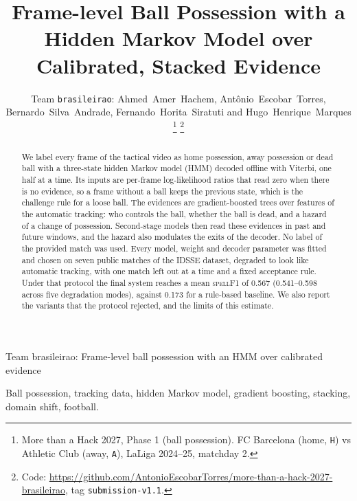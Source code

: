\documentclass[journal]{IEEEtran}
\newcommand{\spf}{\textsc{spellF1}}
\begin{document}
\title{Frame-level Ball Possession with a Hidden Markov Model over Calibrated, Stacked Evidence}

\author{Team \texttt{brasileirao}: Ahmed~Amer~Hachem, Antônio~Escobar~Torres, Bernardo~Silva~Andrade, Fernando~Horita~Siratuti and Hugo~Henrique~Marques%
\thanks{More than a Hack 2027, Phase 1 (ball possession). FC Barcelona (home, \texttt{H}) vs Athletic Club (away, \texttt{A}), LaLiga 2024--25, matchday 2.}%
\thanks{Code: \url{https://github.com/AntonioEscobarTorres/more-than-a-hack-2027-brasileirao}, tag \texttt{submission-v1.1}.}}

%
{Team brasileirao: Frame-level ball possession with an HMM over calibrated evidence}

\maketitle

\begin{abstract}
We label every frame of the tactical video as home possession, away possession or dead ball with a three-state hidden Markov model (HMM) decoded offline with Viterbi, one half at a time. Its inputs are per-frame log-likelihood ratios that read zero when there is no evidence, so a frame without a ball keeps the previous state, which is the challenge rule for a loose ball. The evidences are gradient-boosted trees over features of the automatic tracking: who controls the ball, whether the ball is dead, and a hazard of a change of possession. Second-stage models then read these evidences in past and future windows, and the hazard also modulates the exits of the decoder. No label of the provided match was used. Every model, weight and decoder parameter was fitted and chosen on seven public matches of the IDSSE dataset, degraded to look like automatic tracking, with one match left out at a time and a fixed acceptance rule. Under that protocol the final system reaches a mean \spf{} of 0.567 (0.541--0.598 across five degradation modes), against 0.173 for a rule-based baseline. We also report the variants that the protocol rejected, and the limits of this estimate.
\end{abstract}

\begin{IEEEkeywords}
Ball possession, tracking data, hidden Markov model, gradient boosting, stacking, domain shift, football.
\end{IEEEkeywords}
\end{document}
